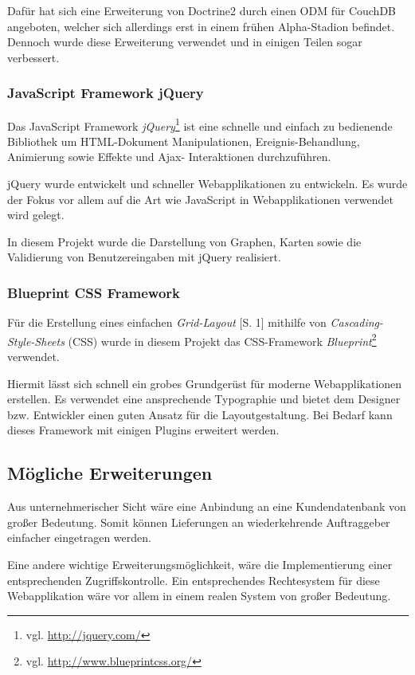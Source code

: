Dafür hat sich eine Erweiterung von Doctrine2 durch einen ODM für CouchDB
	angeboten, welcher sich allerdings erst in einem frühen Alpha-Stadion befindet.
	Dennoch wurde diese Erweiterung verwendet und in einigen Teilen sogar
	verbessert.

\subsubsection{JavaScript Framework jQuery}
Das JavaScript Framework \emph{jQuery}\footnote{vgl. \url{http://jquery.com/}}
	ist eine schnelle und einfach zu bedienende Bibliothek um HTML-Dokument
	Manipulationen,	Ereignis-Behandlung, Animierung sowie Effekte und Ajax-
	Interaktionen durchzuführen.
	
jQuery wurde entwickelt und schneller Webapplikationen zu entwickeln. Es wurde der
	Fokus vor allem auf die Art wie JavaScript in Webapplikationen verwendet wird
	gelegt.
	
In diesem Projekt wurde die Darstellung von Graphen, Karten sowie die Validierung von
	Benutzereingaben mit jQuery realisiert.

\subsubsection{Blueprint CSS Framework}
Für die Erstellung eines einfachen \emph{Grid-Layout} \cite{W3C11}[S. 1] mithilfe von
	\emph{Cascading-Style-Sheets} (CSS) wurde in diesem Projekt das CSS-Framework
	\emph{Blueprint}\footnote{vgl. \url{http://www.blueprintcss.org/}} verwendet.
	
Hiermit lässt sich schnell ein grobes Grundgerüst für moderne Webapplikationen
	erstellen. Es verwendet eine ansprechende Typographie und bietet dem Designer
	bzw. Entwickler einen guten Ansatz für die Layoutgestaltung. Bei Bedarf kann
	dieses Framework mit einigen Plugins erweitert werden.

\subsection{Mögliche Erweiterungen}

Aus unternehmerischer Sicht wäre eine Anbindung an eine Kundendatenbank von
	großer Bedeutung. Somit können Lieferungen an wiederkehrende Auftraggeber
	einfacher eingetragen werden.
	
Eine andere wichtige Erweiterungsmöglichkeit, wäre die Implementierung einer
	entsprechenden Zugriffskontrolle. Ein entsprechendes Rechtesystem für diese
	Webapplikation wäre vor allem in einem realen System von großer Bedeutung.

